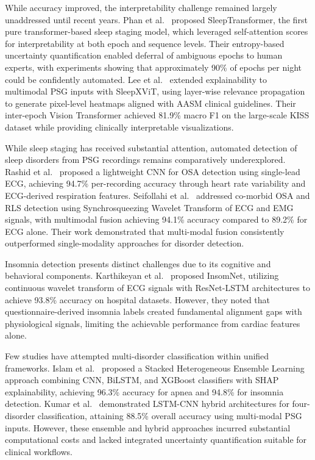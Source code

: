 \documentclass{ieeetj}
\begin{document}
While accuracy improved, the interpretability challenge remained largely unaddressed until recent years. Phan et al.~\cite{phan2022sleeptransformer} proposed SleepTransformer, the first pure transformer-based sleep staging model, which leveraged self-attention scores for interpretability at both epoch and sequence levels. Their entropy-based uncertainty quantification enabled deferral of ambiguous epochs to human experts, with experiments showing that approximately 90\% of epochs per night could be confidently automated. Lee et al.~\cite{lee2025sleepxvit} extended explainability to multimodal PSG inputs with SleepXViT, using layer-wise relevance propagation to generate pixel-level heatmaps aligned with AASM clinical guidelines. Their inter-epoch Vision Transformer achieved 81.9\% macro F1 on the large-scale KISS dataset while providing clinically interpretable visualizations.

While sleep staging has received substantial attention, automated detection of sleep disorders from PSG recordings remains comparatively underexplored. Rashid et al.~\cite{rashid2022osa} proposed a lightweight CNN for OSA detection using single-lead ECG, achieving 94.7\% per-recording accuracy through heart rate variability and ECG-derived respiration features. Seifollahi et al.~\cite{seifollahi2023osarls} addressed co-morbid OSA and RLS detection using Synchrosqueezing Wavelet Transform of ECG and EMG signals, with multimodal fusion achieving 94.1\% accuracy compared to 89.2\% for ECG alone. Their work demonstrated that multi-modal fusion consistently outperformed single-modality approaches for disorder detection.

Insomnia detection presents distinct challenges due to its cognitive and behavioral components. Karthikeyan et al.~\cite{karthikeyan2023insomnet} proposed InsomNet, utilizing continuous wavelet transform of ECG signals with ResNet-LSTM architectures to achieve 93.8\% accuracy on hospital datasets. However, they noted that questionnaire-derived insomnia labels created fundamental alignment gaps with physiological signals, limiting the achievable performance from cardiac features alone.

Few studies have attempted multi-disorder classification within unified frameworks. Islam et al.~\cite{islam2024multishel} proposed a Stacked Heterogeneous Ensemble Learning approach combining CNN, BiLSTM, and XGBoost classifiers with SHAP explainability, achieving 96.3\% accuracy for apnea and 94.8\% for insomnia detection. Kumar et al.~\cite{kumar2021lstmcnn} demonstrated LSTM-CNN hybrid architectures for four-disorder classification, attaining 88.5\% overall accuracy using multi-modal PSG inputs. However, these ensemble and hybrid approaches incurred substantial computational costs and lacked integrated uncertainty quantification suitable for clinical workflows.
\end{document}
